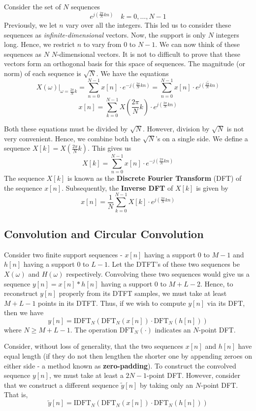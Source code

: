 \documentclass{article}
\theoremstyle{definition}
\begin{document}
Consider the set of $N$ sequences 
\[
    e^{j\left( \frac{2\pi}{N}kn\right)} \quad k = 0, \ldots , N-1
\]
Previously, we let $n$ vary over all the integers. This led us to consider these sequences as \textit{infinite-dimensional} vectors. Now, the support is only $N$ integers long. Hence, we restrict $n$ to vary from $0$ to $N-1$. We can now think of these sequences as $N$ $N$-dimensional vectors. It is not to difficult to prove that these vectors form an orthogonal basis for this space of sequences. The magnitude (or norm) of each sequence is $\sqrt{N}$. We have the equations 
\[
    X(\omega) \vert_{\omega = \frac{2\pi}{N}k} = \sum_{n=0}^{N-1} x[n] \cdot e^{-j\left( \frac{2\pi}{N}kn \right)} = \sum_{n=0}^{N-1} x[n] \cdot \overline{e^{j\left( \frac{2\pi}{N}kn \right)}}
\]
\[
    x[n] = \sum_{k=0}^{N-1} X\left( \frac{2\pi}{N}k \right) \cdot e^{j\left( \frac{2\pi}{N}kn \right)}
\]

Both these equations must be divided by $\sqrt{N}$. However, division by $\sqrt{N}$ is not very convenient. Hence, we combine both the $\sqrt{N}$'s on a single side. We define a sequence $X[k] = X\left(\frac{2\pi}{N}k \right)$. This gives us 
\[
    \boxed{X[k] = \sum_{n=0}^{N-1} x[n] \cdot e^{-j\left( \frac{2\pi}{N}kn \right)}}
\]
The sequence $X[k]$ is known as the \textbf{Discrete Fourier Transform} (DFT) of the sequence $x[n]$. Subsequently, the \textbf{Inverse DFT} of $X[k]$ is given by 
\[
    \boxed{x[n] = \frac{1}{N} \sum_{k=0}^{N-1} X[k] \cdot e^{j\left( \frac{2\pi}{N}kn \right)} }
\]

\subsection{Convolution and Circular Convolution}

Consider two finite support sequences - $x[n]$ having a support $0$ to $M-1$ and $h[n]$ having a support $0$ to $L-1$. Let the DTFT's of these two sequences be $X(\omega)$ and $H(\omega)$ respectively. Convolving these two sequences would give us a sequence $y[n] = x[n] * h[n]$ having a support $0$ to $M+L-2$. Hence, to reconstruct $y[n]$ properly from its DTFT samples, we must take at least $M+L-1$ points in its DTFT. Thus, if we wish to compute $y[n]$ via its DFT, then we have
\[
    y[n] = \text{IDFT}_N( \text{DFT}_N(x[n]) \cdot \text{DFT}_N(h[n]))
\]
where $N \geq M+L-1$. The operation $\text{DFT}_N(\cdot)$ indicates an $N$-point DFT. \medskip

Consider, without loss of generality, that the two sequences $x[n]$ and $h[n]$ have equal length (if they do not then lengthen the shorter one by appending zeroes on either side - a method known as \textbf{zero-padding}). To construct the convolved sequence $y[n]$, we must take at least a $2N-1$-point DFT. However, consider that we construct a different sequence $\widetilde{y}[n]$ by taking only an $N$-point DFT. That is,
\[
    \widetilde{y}[n] = \text{IDFT}_N( \text{DFT}_N(x[n]) \cdot \text{DFT}_N(h[n]))
\]
\end{document}
